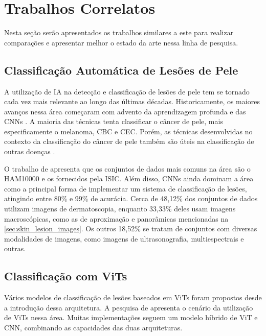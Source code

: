 \chapter{Trabalhos Correlatos} %

Nesta seção serão apresentados os trabalhos similares a este para realizar comparações e apresentar melhor o estado da arte nessa linha de pesquisa.

\section{Classificação Automática de Lesões de Pele}

A utilização de \ac{IA} na detecção e classificação de lesões de pele tem se tornado cada vez mais relevante ao longo das últimas décadas. Historicamente, os maiores
avanços nessa área começaram com advento da aprendizagem profunda e das \acp{CNN} \cite{li2019artificial}. A maioria das técnicas tenta classificar o câncer de pele, mais
especificamente o melanoma, \ac{CBC} e \ac{CEC}. Porém, as técnicas desenvolvidas no contexto da classificação do câncer de pele também são úteis na classificação de
outras doenças \cite{okuboyejo2018review}.

O trabalho de \textcite{skin_cancer_ai} apresenta que os conjuntos de dados mais comuns na área são o HAM10000 e os fornecidos pela \ac{ISIC}. Além disso, \acp{CNN} ainda
dominam a área como a principal forma de implementar um sistema de classificação de lesões, atingindo entre 80\% e 99\% de acurácia. Cerca de 48,12\% dos conjuntos de
dados utilizam imagens de dermatoscopia, enquanto 33,33\% deles usam imagens macroscópicas, como as de aproximação e panorâmicas mencionadas na
\autoref{sec:skin_lesion_images}. Os outros 18,52\% se tratam de conjuntos com diversas modalidades de imagens, como imagens de ultrasonografia, multiespectrais e outras.

\section{Classificação com ViTs}

Vários modelos de classificação de lesões baseados em \acp{ViT} foram propostos desde a introdução dessa arquitetura. A pesquisa de \textcite{khan2023identifying}
apresenta o cenário da utilização de \acp{ViT} nessa área. Muitas implementações seguem um modelo híbrido de \ac{ViT} e \ac{CNN}, combinando as capacidades das duas
arquiteturas.

